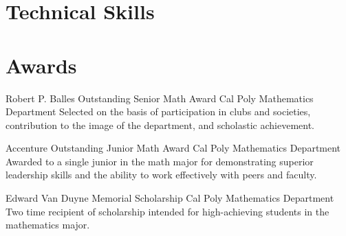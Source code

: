 \documentclass[a4paper, 10pt, sans]{moderncv}
\begin{document}

\section{Technical Skills}


\section{Awards}
        {Robert P. Balles Outstanding Senior Math Award}
        {Cal Poly Mathematics Department}{}{}
        {Selected on the basis of participation in clubs and societies, contribution to the image of the department, and scholastic achievement.\newline}
        
        {Accenture Outstanding Junior Math Award}
        {Cal Poly Mathematics Department}{}{}
        {Awarded to a single junior in the math major for demonstrating superior leadership skills and the ability to work effectively with peers and faculty.\newline}

        {Edward Van Duyne Memorial Scholarship}
        {Cal Poly Mathematics Department}{}{}
        {Two time recipient of scholarship intended for high-achieving students in the mathematics major.\newline}
\end{document}
